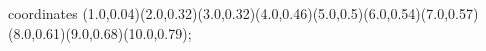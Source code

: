 					coordinates { (1.0,0.04)(2.0,0.32)(3.0,0.32)(4.0,0.46)(5.0,0.5)(6.0,0.54)(7.0,0.57)(8.0,0.61)(9.0,0.68)(10.0,0.79)};